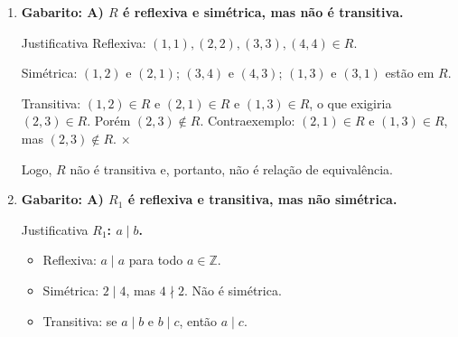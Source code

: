 \documentclass[12pt]{article}
\begin{document}
\begin{enumerate}
\begin{block}{Justificativa}
\textbf{$R_2$: $a < b$.} Não é reflexiva ($a \not< a$). Não é relação de equivalência.

\textbf{$R_3$: $a \cdot b \geq 0$.} Não é transitiva: $(-2) \cdot 0 = 0 \geq 0$ e $0 \cdot 3 = 0 \geq 0$, mas $(-2) \cdot 3 = -6 < 0$. Não é relação de equivalência.

\textbf{$R_4$: $a - b$ múltiplo de 3.} Reflexiva ($a-a=0$), simétrica ($b-a = -(a-b)$), transitiva ($(a-b)+(b-c) = a-c$). \checkmark
\end{block}

\vspace{0.8cm}

\item \textbf{Gabarito: A) $R$ é reflexiva e simétrica, mas não é transitiva.}

\begin{block}{Justificativa}
Reflexiva: $(1,1),(2,2),(3,3),(4,4) \in R$. \checkmark

Simétrica: $(1,2)$ e $(2,1)$; $(3,4)$ e $(4,3)$; $(1,3)$ e $(3,1)$ estão em $R$. \checkmark

Transitiva: $(1,2) \in R$ e $(2,1) \in R$ e $(1,3) \in R$, o que exigiria $(2,3) \in R$. Porém $(2,3) \notin R$. Contraexemplo: $(2,1) \in R$ e $(1,3) \in R$, mas $(2,3) \notin R$. $\times$

Logo, $R$ não é transitiva e, portanto, não é relação de equivalência.
\end{block}

\vspace{0.8cm}

\item \textbf{Gabarito: A) $R_1$ é reflexiva e transitiva, mas não simétrica.}

\begin{block}{Justificativa}
\textbf{$R_1$: $a \mid b$.}
\begin{itemize}
    \item Reflexiva: $a \mid a$ para todo $a \in \mathbb{Z}$. \checkmark
    \item Simétrica: $2 \mid 4$, mas $4 \nmid 2$. Não é simétrica.
    \item Transitiva: se $a \mid b$ e $b \mid c$, então $a \mid c$. \checkmark
\end{itemize}


\end{block}
\end{enumerate}
\end{document}
